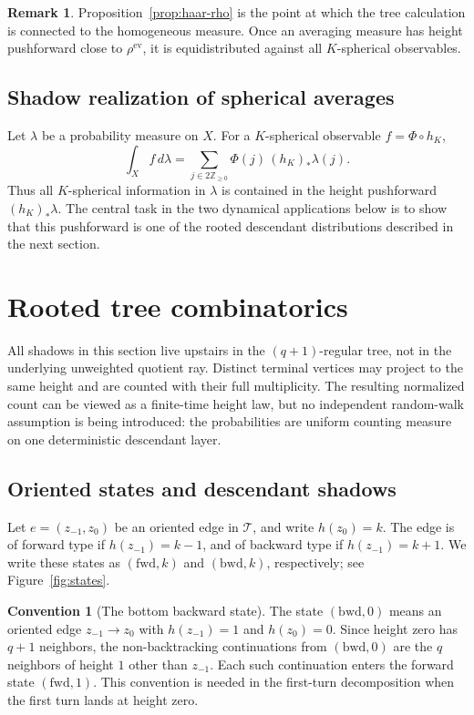 \documentclass[11pt]{amsart}
\theoremstyle{definition}
\newtheorem{remark}[definition]{Remark}
\newtheorem{convention}[definition]{Convention}
\theoremstyle{plain}
\newcommand{\Tree}{\mathcal T}
\newcommand{\ZZ}{\mathbb Z}
\newcommand{\fwd}{\mathrm{fwd}}
\newcommand{\bwd}{\mathrm{bwd}}
\newcommand{\ev}{\mathrm{ev}}
\begin{document}
\begin{remark}
Proposition~\ref{prop:haar-rho} is the point at which the tree calculation is
connected to the homogeneous measure.  Once an averaging measure has height
pushforward close to \(\rho^{\ev}\), it is equidistributed against all
\(K\)-spherical observables.
\end{remark}

\subsection{Shadow realization of spherical averages}
Let \(\lambda\) be a probability measure on \(X\).  For a \(K\)-spherical
observable \(f=\Phi\circ h_K\),
\[
\int_X f\,d\lambda=
\sum_{j\in2\ZZ_{\ge0}}\Phi(j)\,(h_K)_*\lambda(j).
\]
Thus all \(K\)-spherical information in \(\lambda\) is contained in the height
pushforward \((h_K)_*\lambda\).  The central task in the two dynamical
applications below is to show that this pushforward is one of the rooted
descendant distributions described in the next section.

\section{Rooted tree combinatorics}\label{sec:rooted-tree}

All shadows in this section live upstairs in the \((q+1)\)-regular tree, not
in the underlying unweighted quotient ray.  Distinct terminal vertices may
project to the same height and are counted with their full multiplicity.  The
resulting normalized count can be viewed as a finite-time height law, but no
independent random-walk assumption is being introduced: the probabilities are
uniform counting measure on one deterministic descendant layer.

\subsection{Oriented states and descendant shadows}
Let \(e=(z_{-1},z_0)\) be an oriented edge in \(\Tree\), and write \(h(z_0)=k\).
The edge is of forward type if \(h(z_{-1})=k-1\), and of backward type if
\(h(z_{-1})=k+1\).  We write these states as \((\fwd,k)\) and \((\bwd,k)\),
respectively; see Figure~\ref{fig:states}.

\begin{convention}[The bottom backward state]\label{conv:bottom-backward}
The state \((\bwd,0)\) means an oriented edge \(z_{-1}\to z_0\) with
\(h(z_{-1})=1\) and \(h(z_0)=0\).  Since height zero has \(q+1\) neighbors, the
non-backtracking continuations from \((\bwd,0)\) are the \(q\) neighbors of
height \(1\) other than \(z_{-1}\).  Each such continuation enters the forward
state \((\fwd,1)\).  This convention is needed in the first-turn decomposition
when the first turn lands at height zero.
\end{convention}
\end{document}
